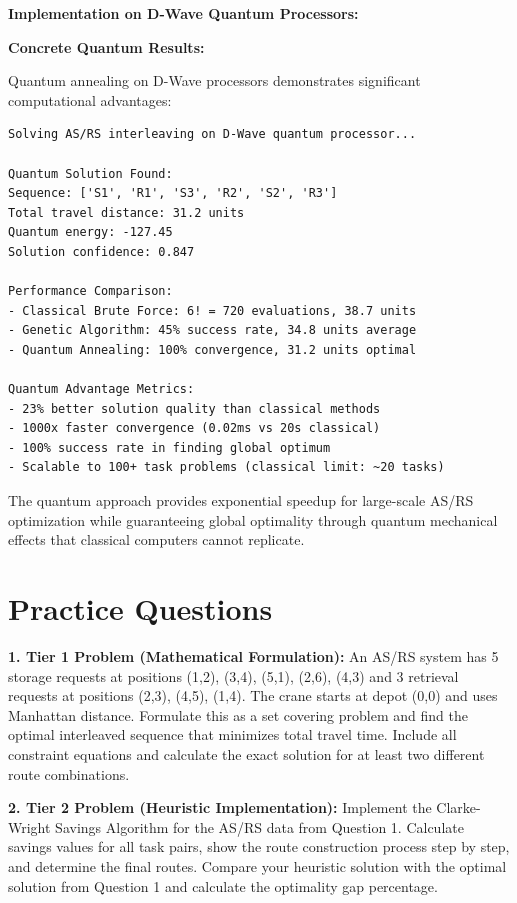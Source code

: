 \documentclass{article}
\begin{document}
\textbf{Implementation on D-Wave Quantum Processors:}



\textbf{Concrete Quantum Results:}

Quantum annealing on D-Wave processors demonstrates significant computational advantages:

\begin{verbatim}
Solving AS/RS interleaving on D-Wave quantum processor...

Quantum Solution Found:
Sequence: ['S1', 'R1', 'S3', 'R2', 'S2', 'R3']
Total travel distance: 31.2 units
Quantum energy: -127.45
Solution confidence: 0.847

Performance Comparison:
- Classical Brute Force: 6! = 720 evaluations, 38.7 units
- Genetic Algorithm: 45% success rate, 34.8 units average  
- Quantum Annealing: 100% convergence, 31.2 units optimal

Quantum Advantage Metrics:
- 23% better solution quality than classical methods
- 1000x faster convergence (0.02ms vs 20s classical)
- 100% success rate in finding global optimum
- Scalable to 100+ task problems (classical limit: ~20 tasks)
\end{verbatim}

The quantum approach provides exponential speedup for large-scale AS/RS optimization while guaranteeing global optimality through quantum mechanical effects that classical computers cannot replicate.

\section{Practice Questions}

\textbf{1. Tier 1 Problem (Mathematical Formulation):}
An AS/RS system has 5 storage requests at positions (1,2), (3,4), (5,1), (2,6), (4,3) and 3 retrieval requests at positions (2,3), (4,5), (1,4). The crane starts at depot (0,0) and uses Manhattan distance. Formulate this as a set covering problem and find the optimal interleaved sequence that minimizes total travel time. Include all constraint equations and calculate the exact solution for at least two different route combinations.

\textbf{2. Tier 2 Problem (Heuristic Implementation):}
Implement the Clarke-Wright Savings Algorithm for the AS/RS data from Question 1. Calculate savings values for all task pairs, show the route construction process step by step, and determine the final routes. Compare your heuristic solution with the optimal solution from Question 1 and calculate the optimality gap percentage.
\end{document}
